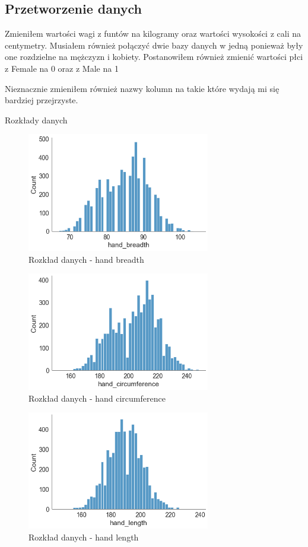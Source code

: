 \documentclass{article}
\begin{document}
\subsection{Przetworzenie danych}
Zmieniłem wartości wagi z funtów na kilogramy oraz wartości wysokości z cali na centymetry. Musiałem również połączyć dwie bazy danych w jedną ponieważ były one rozdzielne na mężczyzn i kobiety. Postanowiłem również zmienić wartości płci z Female na 0 oraz z Male na 1

Nieznacznie zmieniłem również nazwy kolumn na takie które wydają mi się bardziej przejrzyste.



\begin{subsection} {Rozkłady danych}

\begin{figure}[H]
    \centering
    \includegraphics[width=8cm]{hand breadth.png}
    \caption{Rozkład danych - hand breadth}
    \label{fig:my_img}
\end{figure}


\begin{figure}[H]
    \centering
    \includegraphics[width=8cm]{hand_circumference.png}
    \caption{Rozkład danych - hand circumference}
    \label{fig:my_img}
\end{figure}

\begin{figure}[H]
    \centering
    \includegraphics[width=8cm]{hand_length.png}
    \caption{Rozkład danych - hand length}
    \label{fig:my_img}
\end{figure}


\end{subsection}
\end{document}
